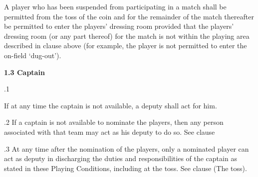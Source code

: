 \documentclass[12pt]{article}
\begin{document}
\vspace{\baselineskip}
\begin{adjustwidth}{0.5in}{0.07in}
{\fontsize{9pt}{10.8pt}\selectfont A player who has been suspended from participating in a match shall be permitted from the toss of the coin and for the remainder of the match thereafter be permitted to enter the players’ dressing room provided that the players’ dressing room (or any part thereof) for the match is not within the playing area described in clause above (for example, the player is not permitted to enter the on-field ‘dug-out’).\par}\par

\end{adjustwidth}


\vspace{\baselineskip}
{\fontsize{11pt}{13.2pt}\selectfont \textbf{1.3 \tabto{0.47in} Captain}\par}\par


\vspace{\baselineskip}
{\fontsize{9pt}{10.8pt}.1 \tabto{0.49in} {\fontsize{8pt}{9.6pt}\selectfont If at any time the captain is not available, a deputy shall act for him.\par}\par}\par


\vspace{\baselineskip}
\begin{adjustwidth}{0.5in}{0.15in}
{\fontsize{9pt}{10.8pt}.2 \tabto{0.49in} If a captain is not available to nominate the players, then any person associated with that team may act as his deputy to do so. See clause \par}\par

\end{adjustwidth}


\vspace{\baselineskip}
\begin{adjustwidth}{0.5in}{0.03in}
{\fontsize{9pt}{10.8pt}.3 \tabto{0.49in} At any time after the nomination of the players, only a nominated player can act as deputy in discharging the duties and responsibilities of the captain as stated in these Playing Conditions, including at the toss. See clause (The toss).\par}\par

\end{adjustwidth}
\end{document}
